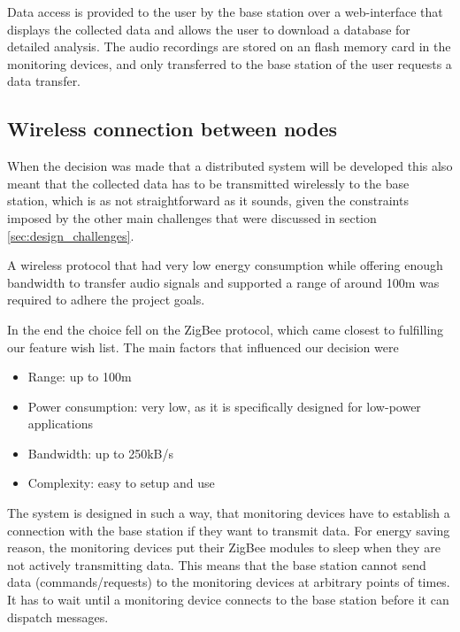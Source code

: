 Data access is provided to the user by the base station over a web-interface that displays the collected data and allows the user to download a database for detailed analysis. The audio recordings are stored on an flash memory card in the monitoring devices, and only transferred to the base station of the user requests a data transfer.

\subsection{Wireless connection between nodes}
\label{sec:wireless_connection}
When the decision was made that a distributed system will be developed this also meant that the collected data has to be transmitted wirelessly to the base station, which is as not straightforward as it sounds, given the constraints imposed by the other main challenges that were discussed in section \ref{sec:design_challenges}.

A wireless protocol that had very low energy consumption while offering enough bandwidth to transfer audio signals and supported a range of around 100m was required to adhere the project goals.

In the end the choice fell on the ZigBee protocol, which came closest to fulfilling our feature wish list. The main factors that influenced our decision were
\begin{itemize}
\item Range: up to 100m
\item Power consumption: very low, as it is specifically designed for low-power applications
\item Bandwidth: up to 250kB/s
\item Complexity: easy to setup and use
\end{itemize}

The system is designed in such a way, that monitoring devices have to establish a connection with the base station if they want to transmit data. For energy saving reason, the monitoring devices put their ZigBee modules to sleep when they are not actively transmitting data. This means that the base station cannot send data (commands/requests) to the monitoring devices at arbitrary points of times. It has to wait until a monitoring device connects to the base station before it can dispatch messages. 

